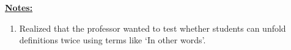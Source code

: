 \documentclass[12pt]{article}
\begin{document}















\bigskip

\underline{\textbf{Notes:}}

\bigskip

\begin{enumerate}[1.]
    \item Realized that the professor wanted to test whether students can unfold
    definitions twice using terms like `In other words'.
\end{enumerate}
\end{document}
